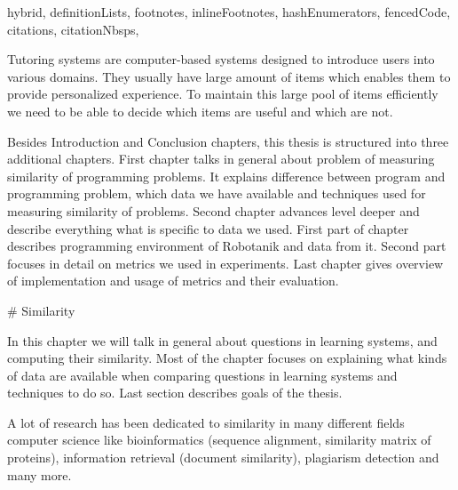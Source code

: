 \documentclass[
  digital, %
  table,   %
  nolof,     %
  nolot,     %
  nocover
]{fithesis3}
\begin{document}
\begin{markdown*}{%
  hybrid,
  definitionLists,
  footnotes,
  inlineFootnotes,
  hashEnumerators,
  fencedCode,
  citations,
  citationNbsps,
}


Tutoring systems are computer-based systems designed to introduce users into various domains.
They usually have large amount of items which enables them to provide personalized experience. To maintain this large pool of items efficiently we need to be able to decide which items are useful and which are not.




Besides Introduction and Conclusion chapters, this thesis is structured into three additional chapters. First chapter talks in general about problem of measuring similarity of programming problems. It explains difference between program and programming problem, which data we have available and techniques used for measuring similarity of problems. Second chapter advances level deeper and describe everything what is specific to data we used. First part of chapter describes programming environment of Robotanik and data from it. Second part focuses in detail on metrics we used in experiments. Last chapter gives overview of implementation and usage of metrics and their evaluation.

# Similarity


In this chapter we will talk in general about questions in learning systems, and computing their similarity. Most of the chapter focuses on explaining what kinds of data are available when comparing questions in learning systems and techniques to do so. Last section describes goals of the thesis.

A lot of research has been dedicated to similarity in many different fields computer science like bioinformatics (sequence alignment, similarity matrix of proteins), information retrieval (document similarity), plagiarism detection and many more.


\end{markdown*}
\end{document}
